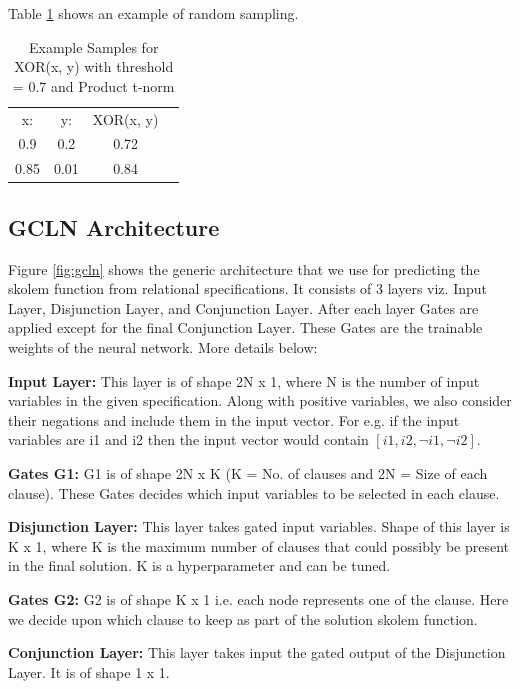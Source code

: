 Table \ref{tab:tnorms} shows an example of random sampling.

\begin{table}[t]
\centering
\begin{tabular}{cccc}
	x: & y: & XOR(x, y)\\ 
	0.9 & 0.2 & 0.72 \\  
	0.85 & 0.01 & 0.84
\end{tabular}
\caption{Example Samples for XOR(x, y) with threshold = 0.7 and Product t-norm}
\label{tab:tnorms}
\end{table}


\subsection{GCLN Architecture}
Figure \ref{fig:gcln} shows the generic architecture that we use for predicting the skolem function from relational specifications.
It consists of 3 layers viz. Input Layer, Disjunction Layer, and Conjunction Layer. After each layer Gates are applied except for the final Conjunction Layer.
These Gates are the trainable weights of the neural network. More details below:

\noindent\textbf{Input Layer:} This layer is of shape 2N x 1, where N is the number of input variables in the given specification. 
Along with positive variables, we also consider their negations and include them in the input vector. For e.g. if the input variables 
are i1 and i2 then the input vector would contain $[i1, i2, \neg{i1}, \neg{i2}]$.

\noindent\textbf{Gates G1:} G1 is of shape 2N x K (K = No. of clauses and 2N = Size of each clause).
These Gates decides which input variables to be selected in each clause.

\noindent\textbf{Disjunction Layer:} This layer takes gated input variables. Shape of this layer is K x 1, where K is the maximum 
number of clauses that could possibly be present in the final solution. K is a hyperparameter and can be tuned.

\noindent\textbf{Gates G2:} G2 is of shape K x 1 i.e. each node represents one of the clause. 
Here we decide upon which clause to keep as part of the solution skolem function.

\noindent\textbf{Conjunction Layer:} This layer takes input the gated output of the Disjunction Layer. It is of shape 1 x 1. 

